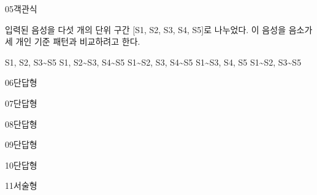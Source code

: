 \documentclass[fs9,seriesRus]{korfarm-base}
\begin{document}
\begin{kfQBlock}{05}{객관식}
\begin{kfEvidence}입력된 음성을 다섯 개의 단위 구간 [S1, S2, S3, S4, S5]로 나누었다. 이 음성을 음소가 세 개인 기준 패턴과 비교하려고 한다.\end{kfEvidence}
\begin{kfChoices}
\kfChoice S1, S2, S3\textasciitilde{}S5
\kfChoice S1, S2\textasciitilde{}S3, S4\textasciitilde{}S5
\kfChoice S1\textasciitilde{}S2, S3, S4\textasciitilde{}S5
\kfChoice S1\textasciitilde{}S3, S4, S5
\kfChoice S1\textasciitilde{}S2, S3\textasciitilde{}S5
\end{kfChoices}
\end{kfQBlock}
\begin{kfQBlock}{06}{단답형}
\end{kfQBlock}
\begin{kfQBlock}{07}{단답형}
\end{kfQBlock}
\begin{kfQBlock}{08}{단답형}
\end{kfQBlock}
\begin{kfQBlock}{09}{단답형}
\end{kfQBlock}
\begin{kfQBlock}{10}{단답형}
\end{kfQBlock}
\begin{kfQBlock}{11}{서술형}
\end{kfQBlock}
\kfEndMC
\end{document}
